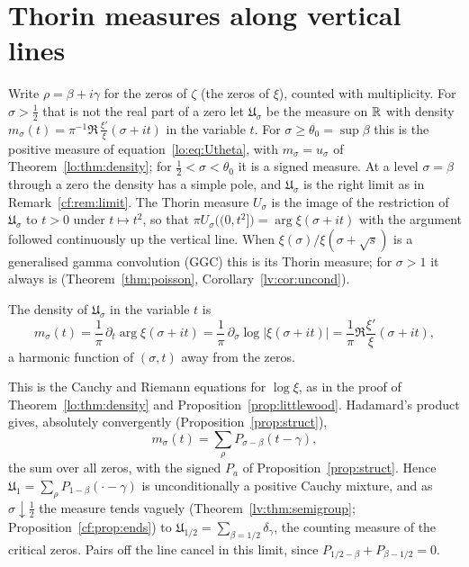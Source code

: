 \section{Thorin measures along vertical lines}\label{bsy:sec:thorin}

Write $\rho=\beta+i\gamma$ for the zeros of $\zeta$ (the zeros of $\xi$), counted with multiplicity. For $\sigma>\frac12$ that is not the real part of a zero let $\mathfrak U_\sigma$ be the measure on $\mathbb{R}$ with density $m_\sigma(t)=\pi^{-1}\Re\,\frac{\xi'}\xi(\sigma+it)$ in the variable $t$. For $\sigma\ge\theta_0=\sup\beta$ this is the positive measure of equation~\eqref{lo:eq:Utheta}, with $m_\sigma=u_\sigma$ of Theorem~\ref{lo:thm:density}; for $\frac12<\sigma<\theta_0$ it is a signed measure. At a level $\sigma=\beta$ through a zero the density has a simple pole, and $\mathfrak U_\sigma$ is the right limit as in Remark~\ref{cf:rem:limit}. The Thorin measure $U_\sigma$ is the image of the restriction of $\mathfrak U_\sigma$ to $t>0$ under $t\mapsto t^2$, so that $\pi U_\sigma\bigl((0,t^2]\bigr)=\arg\xi(\sigma+it)$ with the argument followed continuously up the vertical line. When $\xi(\sigma)/\xi(\sigma+\sqrt s)$ is a generalised gamma convolution (GGC) this is its Thorin measure; for $\sigma>1$ it always is (Theorem~\ref{thm:poisson}, Corollary~\ref{lv:cor:uncond}).

\begin{lemma}\label{bsy:lem:cr}
The density of $\mathfrak U_\sigma$ in the variable $t$ is
\[
m_\sigma(t)=\frac1\pi\,\partial_t\arg\xi(\sigma+it)=\frac1\pi\,\partial_\sigma\log|\xi(\sigma+it)|=\frac1\pi\Re\frac{\xi'}{\xi}(\sigma+it),
\]
a harmonic function of $(\sigma,t)$ away from the zeros.
\end{lemma}

This is the Cauchy and Riemann equations for $\log\xi$, as in the proof of Theorem~\ref{lo:thm:density} and Proposition~\ref{prop:littlewood}. Hadamard's product gives, absolutely convergently (Proposition~\ref{prop:struct}),
\begin{equation}\label{bsy:eq:had}
m_\sigma(t)=\sum_\rho P_{\sigma-\beta}(t-\gamma),
\end{equation}
the sum over all zeros, with the signed $P_a$ of Proposition~\ref{prop:struct}. Hence $\mathfrak U_1=\sum_\rho P_{1-\beta}(\cdot-\gamma)$ is unconditionally a positive Cauchy mixture, and as $\sigma\downarrow\frac12$ the measure tends vaguely (Theorem~\ref{lv:thm:semigroup}; Proposition~\ref{cf:prop:ends}) to $\mathfrak U_{1/2}=\sum_{\beta=1/2}\delta_\gamma$, the counting measure of the critical zeros. Pairs off the line cancel in this limit, since $P_{1/2-\beta}+P_{\beta-1/2}=0$.

